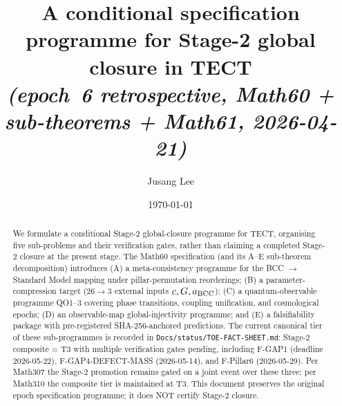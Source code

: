 



\title{A conditional specification programme for Stage-2 global
closure in TECT \\ \normalsize{\textit{(epoch~6 retrospective,
Math60 + sub-theorems + Math61, 2026-04-21)}}}

\author{Jusang Lee}

\date{\today}

\begin{abstract}
We formulate a conditional Stage-2 global-closure programme for TECT,
organising five sub-problems and their verification gates, rather
than claiming a completed Stage-2 closure at the present stage. The
Math60 specification (and its A--E sub-theorem decomposition)
introduces (A) a meta-consistency programme for the BCC $\to$
Standard Model mapping under pillar-permutation reorderings;
(B) a parameter-compression target ($26 \to 3$ external inputs
$c, G, a_{\rm BCC}$); (C) a quantum-observable programme QO1--3
covering phase transitions, coupling unification, and cosmological
epochs; (D) an observable-map global-injectivity programme; and
(E) a falsifiability package with pre-registered SHA-256-anchored
predictions. The current canonical tier of these sub-programmes is
recorded in \texttt{Docs/status/TOE-FACT-SHEET.md}: Stage-2
composite = T3 with multiple verification gates pending, including
F-GAP1 (deadline 2026-05-22), F-GAP4-DEFECT-MASS (2026-05-14), and
F-Pillar6 (2026-05-29). Per Math307 the Stage-2 promotion remains
gated on a joint event over these three; per Math310 the composite
tier is maintained at T3. This document preserves the original epoch
specification programme; it does NOT certify Stage-2 closure.
\cite{Math60, Math60AddA, Math60AddB, Math60AddC, Math60AddD, Math60AddE, Math61}
\end{abstract}

